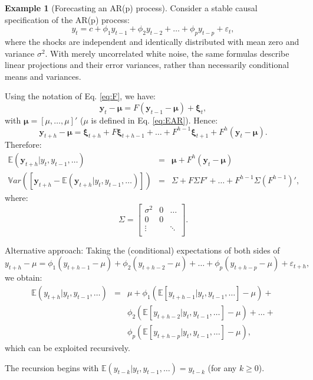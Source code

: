 \documentclass[
  11pt,
]{book}
\theoremstyle{definition}
\theoremstyle{definition}
\newtheorem{example}{Example}[chapter]
\theoremstyle{definition}
\theoremstyle{definition}
\theoremstyle{remark}
\begin{document}
\begin{example}[Forecasting an AR(p) process]
\protect\hypertarget{exm:fcstARp}{}\label{exm:fcstARp}Consider a stable causal specification of the AR(p) process:
\[
y_t = c + \phi_1 y_{t-1} + \phi_2 y_{t-2} + \dots + \phi_p y_{t-p} + \varepsilon_t,
\]
where the shocks are independent and identically distributed with mean zero and variance \(\sigma^2\). With merely uncorrelated white noise, the same formulas describe linear projections and their error variances, rather than necessarily conditional means and variances.

Using the notation of Eq. \eqref{eq:F}, we have:
\[
\mathbf{y}_t - \boldsymbol\mu = F (\mathbf{y}_{t-1}- \boldsymbol\mu) + \boldsymbol\xi_t,
\]
with \(\boldsymbol\mu = [\mu,\dots,\mu]'\) (\(\mu\) is defined in Eq. \eqref{eq:EAR}). Hence:
\[
\mathbf{y}_{t+h} - \boldsymbol\mu = \boldsymbol\xi_{t+h} + F \boldsymbol\xi_{t+h-1} + \dots + F^{h-1} \boldsymbol\xi_{t+1} + F^h (\mathbf{y}_{t}- \boldsymbol\mu).
\]
Therefore:
\begin{eqnarray*}
\mathbb{E}(\mathbf{y}_{t+h}|y_{t},y_{t-1},\dots) &=& \boldsymbol\mu + F^{h}(\mathbf{y}_t - \boldsymbol\mu)\\
\mathbb{V}ar\left([\mathbf{y}_{t+h} - \mathbb{E}(\mathbf{y}_{t+h}|y_{t},y_{t-1},\dots)] \right) &=& \Sigma + F\Sigma F' + \dots + F^{h-1}\Sigma (F^{h-1})',
\end{eqnarray*}
where:
\[
\Sigma = \left[
\begin{array}{ccc}
\sigma^2  & 0& \dots\\
0  & 0 & \\
\vdots  & & \ddots \\
\end{array}
\right].
\]

Alternative approach: Taking the (conditional) expectations of both sides of
\[
y_{t+h} - \mu = \phi_1 (y_{t+h-1} - \mu) + \phi_2 (y_{t+h-2} - \mu) + \dots + \phi_p (y_{t+h-p} - \mu) + \varepsilon_{t+h},
\]
we obtain:
\begin{eqnarray*}
\mathbb{E}(y_{t+h}|y_{t},y_{t-1},\dots) &=& \mu + \phi_1\left(\mathbb{E}[y_{t+h-1}|y_{t},y_{t-1},\dots] - \mu\right)+\\
&&\phi_2\left(\mathbb{E}[y_{t+h-2}|y_{t},y_{t-1},\dots] - \mu\right) + \dots +\\
&& \phi_p\left(\mathbb{E}[y_{t+h-p}|y_{t},y_{t-1},\dots] - \mu\right),
\end{eqnarray*}
which can be exploited recursively.

The recursion begins with \(\mathbb{E}(y_{t-k}|y_{t},y_{t-1},\dots)=y_{t-k}\) (for any \(k \ge 0\)).
\end{example}
\end{document}
